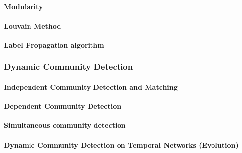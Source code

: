 \documentclass[
acmsmall,
nonacm,
screen,
acmthm]{../../scripts/pandoc/templates/acmart}
\begin{document}
\hypertarget{modularity}{%
\paragraph{Modularity}\label{modularity}}

\hypertarget{louvain-method}{%
\paragraph{Louvain Method}\label{louvain-method}}

\hypertarget{label-propagation-algorithm}{%
\paragraph{Label Propagation
algorithm}\label{label-propagation-algorithm}}

\hypertarget{dynamic-community-detection}{%
\subsubsection{Dynamic Community
Detection}\label{dynamic-community-detection}}

\hypertarget{independent-community-detection-and-matching}{%
\paragraph{Independent Community Detection and
Matching}\label{independent-community-detection-and-matching}}

\hypertarget{dependent-community-detection}{%
\paragraph{Dependent Community
Detection}\label{dependent-community-detection}}

\hypertarget{simultaneous-community-detection}{%
\paragraph{Simultaneous community
detection}\label{simultaneous-community-detection}}

\hypertarget{dynamic-community-detection-on-temporal-networks-evolution}{%
\paragraph{Dynamic Community Detection on Temporal Networks
(Evolution)}\label{dynamic-community-detection-on-temporal-networks-evolution}}
\end{document}
